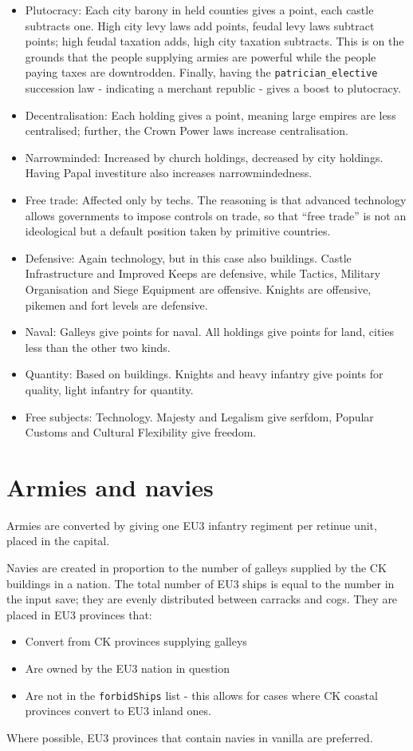 \documentclass[12pt,ebook,oneside]{book}
\begin{document}
\begin{itemize}
\item Plutocracy: Each city barony in held counties gives a point, each castle
  subtracts one. High city levy laws add points, feudal levy laws subtract
  points; high feudal taxation adds, high city taxation
  subtracts. This is on the grounds that the people supplying armies are
  powerful while the people paying taxes are downtrodden. Finally,
  having the \verb|patrician_elective| succession law - indicating a
  merchant republic - gives a boost to plutocracy. 
\item Decentralisation: Each holding gives a point, meaning large
  empires are less centralised; further, the Crown Power laws increase
  centralisation. 
\item Narrowminded: Increased by church holdings, decreased by city
  holdings. Having Papal investiture also increases narrowmindedness. 
\item Free trade: Affected only by techs. The reasoning is that
  advanced technology allows governments to impose controls on trade,
  so that ``free trade'' is not an ideological but a default position
  taken by primitive countries. 
\item Defensive: Again technology, but in this case also buildings. Castle Infrastructure and Improved
  Keeps are defensive, while Tactics, Military Organisation and Siege
  Equipment are offensive. Knights are offensive, pikemen and fort
  levels are defensive. 
\item Naval: Galleys give points for naval. All holdings give points
  for land, cities less than the other two kinds. 
\item Quantity: Based on buildings. Knights and heavy infantry give
  points for quality, light infantry for quantity. 
\item Free subjects: Technology. Majesty and Legalism give serfdom,
  Popular Customs and Cultural Flexibility give freedom. 
\end{itemize}

\section{Armies and navies}

Armies are converted by giving one EU3 infantry regiment per retinue
unit, placed in the capital. 

Navies are created in proportion to the number of galleys supplied by
the CK buildings in a nation. The total number of EU3 ships is equal
to the number in the input save; they are evenly distributed
between carracks and cogs. They are placed in EU3 provinces that:
\begin{itemize}
\item Convert from CK provinces supplying galleys
\item Are owned by the EU3 nation in question
\item Are not in the \verb|forbidShips| list - this allows for cases
  where CK coastal provinces convert to EU3 inland ones.
\end{itemize}
Where possible, EU3 provinces that contain navies in vanilla are
preferred. 
\end{document}

